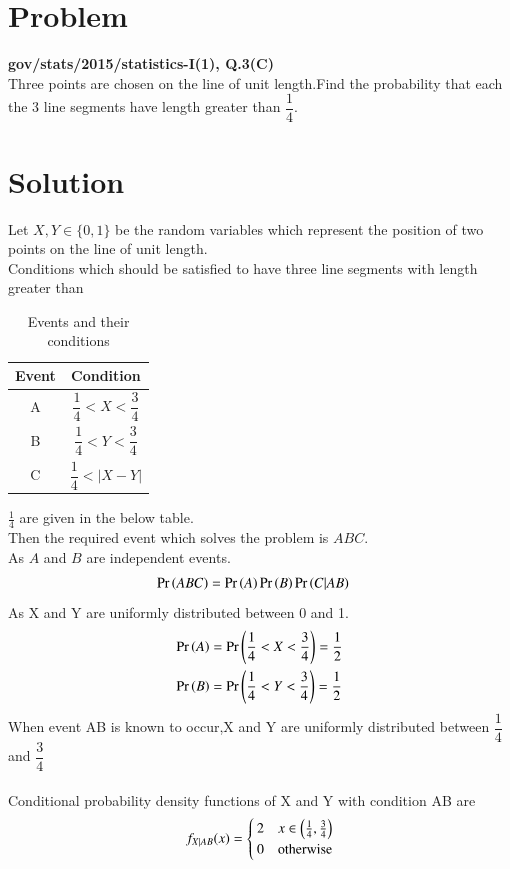 \documentclass[journal,12pt,twocolumn]{IEEEtran}
\begin{document}
\section{Problem}
\textbf{gov/stats/2015/statistics-I(1), Q.3(C)}\\
  Three points are chosen on the line of unit length.Find the probability that each the 3 line segments have length greater than $\dfrac{1}{4}$.
\section{Solution}
Let $X,Y \in \{0,1\}$ be the random variables which represent the position of two points on the line of unit length.\\
Conditions which should be satisfied to have three line segments with length greater than 
\begin{table}[h]
\centering
\bgroup
\def\arraystretch{2}
\begin{tabular}{|c|c|}
\hline
\textbf{Event} & \textbf{Condition}                     \\\hline
A              & $\dfrac{1}{4}<X<\dfrac{3}{4}$ \\[1ex] \hline
B              & $\dfrac{1}{4}<Y<\dfrac{3}{4}$ \\[1ex] \hline
C              & $\dfrac{1}{4}<|X-Y|$ \\[1ex] \hline
\end{tabular}
\egroup
\caption{Events and their conditions}
\label{tab:Events}
\end{table}
$\frac{1}{4}$ are given in the below table.\\
Then the required event which solves the problem is $ABC$.\\
As $A$ and $B$ are independent events.
\begin{align}
    \Pr\left(ABC\right)&=\Pr\left(A\right)\Pr\left(B\right)\Pr\left(C|AB\right)
\end{align}
As X and Y are uniformly distributed between 0 and 1.
\begin{align}
    \Pr\left(A\right)&=\Pr\left(\dfrac{1}{4}<X<\dfrac{3}{4}\right)=\dfrac{1}{2}\\
    \Pr\left(B\right)&=\Pr\left(\dfrac{1}{4}<Y<\dfrac{3}{4}\right)=\dfrac{1}{2}
\end{align}
When event AB is known to occur,X and Y are uniformly distributed between $\dfrac{1}{4}$ and $\dfrac{3}{4}$\\\\ 
Conditional probability density functions of X and Y with condition AB are
\begin{align}
    f_{X|AB}(x) = 
    \begin{cases}
    2 & x\in \left(\frac{1}{4},\frac{3}{4}\right)\\
    0 & \text{otherwise}
    \end{cases}
\end{align}
\end{document}

